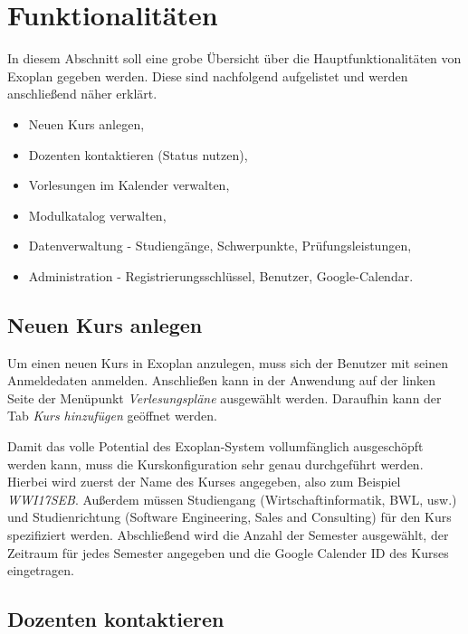 \section{Funktionalitäten}

In diesem Abschnitt soll eine grobe Übersicht über die Hauptfunktionalitäten von Exoplan gegeben werden. Diese sind nachfolgend aufgelistet und werden anschließend näher erklärt.

\begin{itemize}
	\item Neuen Kurs anlegen,
	\item Dozenten kontaktieren (Status nutzen),
	\item Vorlesungen im Kalender verwalten,
	\item Modulkatalog verwalten,
	\item Datenverwaltung - Studiengänge, Schwerpunkte, Prüfungsleistungen,
	\item Administration - Registrierungsschlüssel, Benutzer, Google-Calendar.
\end{itemize}

\subsection{Neuen Kurs anlegen}

Um einen neuen Kurs in Exoplan anzulegen, muss sich der Benutzer mit seinen Anmeldedaten anmelden. Anschließen kann in der Anwendung auf der linken Seite der Menüpunkt \textit{Verlesungspläne} ausgewählt werden. Daraufhin kann der Tab \textit{Kurs hinzufügen} geöffnet werden.

Damit das volle Potential des Exoplan-System vollumfänglich ausgeschöpft werden kann, muss die Kurskonfiguration sehr genau durchgeführt werden. Hierbei wird zuerst der Name des Kurses angegeben, also zum Beispiel \textit{WWI17SEB}. Außerdem müssen Studiengang (Wirtschaftinformatik, BWL, usw.) und Studienrichtung (Software Engineering, Sales and Consulting) für den Kurs spezifiziert werden. Abschließend wird die Anzahl der Semester ausgewählt, der Zeitraum für jedes Semester angegeben und die Google Calender ID des Kurses eingetragen.

\subsection{Dozenten kontaktieren}

